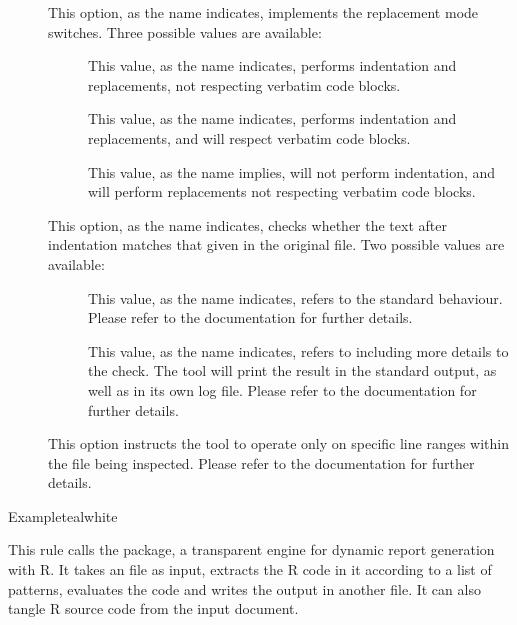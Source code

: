 \begin{description}
\begin{description}
\item[] This option, as the name indicates, implements the replacement mode switches. Three possible values are available:

\begin{description}
\item[] This value, as the name indicates, performs indentation and replacements, not respecting verbatim code blocks.

\item[] This value, as the name indicates, performs indentation and replacements, and will respect verbatim code blocks.

\item[] This value, as the name implies, will not perform indentation, and will perform replacements not respecting verbatim code blocks.
\end{description}

\item[] This option, as the name indicates, checks whether the text after indentation matches that given in the original file. Two possible values are available:

\begin{description}
\item[] This value, as the name indicates, refers to the standard behaviour. Please refer to the documentation for further details.

\item[] This value, as the name indicates, refers to including more details to the check. The tool will print the result in the standard output, as well as in its own log file. Please refer to the documentation for further details.
\end{description}

\item[] This option instructs the tool to operate only on specific line ranges within the file being inspected. Please refer to the documentation for further details.
\end{description}

\begin{codebox}{Example}{teal}{\icnote}{white}
\end{codebox}

\item[\rulebox{knitr}]
This rule calls the  package, a transparent engine for dynamic report generation with R. It takes an  file as input, extracts the R code in it according to a list of patterns, evaluates the code and writes the output in another file. It can also tangle R source code from the input document.


\end{description}
